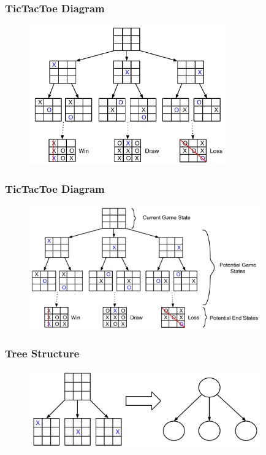 \documentclass{beamer}
\begin{document}
\begin{frame}[fragile]
\frametitle{TicTacToe Diagram}
\begin{figure}[h]
	\includegraphics[width=8.5cm]{Diagrams/TicTacToe/TicTacToeTreeExtended.pdf}
	\centering
\end{figure}
\end{frame}

\begin{frame}[fragile]
\frametitle{TicTacToe Diagram}
\begin{figure}[h]
	\includegraphics[width=10cm]{Diagrams/TicTacToe/TicTacToeTreeExtendedLabeled.pdf}
	\centering
\end{figure}
\end{frame}

\begin{frame}[fragile]
\frametitle{Tree Structure}
\begin{figure}[h]
	\includegraphics[width=10cm]{Diagrams/TicTacToe/MapToTree.pdf}
	\centering
\end{figure}
\end{frame}
\end{document}

